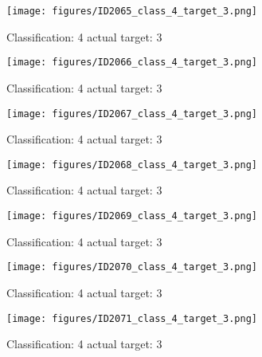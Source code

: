 \begin{figure}[h!]
\begin{center}
\texttt{[image: figures/ID2065\_class\_4\_target\_3.png]}
\end{center}
\caption{ Classification: 4 actual target: 3}
\label{fig:ID2065_class_4_target_3}
\end{figure}
\begin{figure}[h!]
\begin{center}
\texttt{[image: figures/ID2066\_class\_4\_target\_3.png]}
\end{center}
\caption{ Classification: 4 actual target: 3}
\label{fig:ID2066_class_4_target_3}
\end{figure}
\begin{figure}[h!]
\begin{center}
\texttt{[image: figures/ID2067\_class\_4\_target\_3.png]}
\end{center}
\caption{ Classification: 4 actual target: 3}
\label{fig:ID2067_class_4_target_3}
\end{figure}
\begin{figure}[h!]
\begin{center}
\texttt{[image: figures/ID2068\_class\_4\_target\_3.png]}
\end{center}
\caption{ Classification: 4 actual target: 3}
\label{fig:ID2068_class_4_target_3}
\end{figure}
\begin{figure}[h!]
\begin{center}
\texttt{[image: figures/ID2069\_class\_4\_target\_3.png]}
\end{center}
\caption{ Classification: 4 actual target: 3}
\label{fig:ID2069_class_4_target_3}
\end{figure}
\begin{figure}[h!]
\begin{center}
\texttt{[image: figures/ID2070\_class\_4\_target\_3.png]}
\end{center}
\caption{ Classification: 4 actual target: 3}
\label{fig:ID2070_class_4_target_3}
\end{figure}
\begin{figure}[h!]
\begin{center}
\texttt{[image: figures/ID2071\_class\_4\_target\_3.png]}
\end{center}
\caption{ Classification: 4 actual target: 3}
\label{fig:ID2071_class_4_target_3}
\end{figure}
